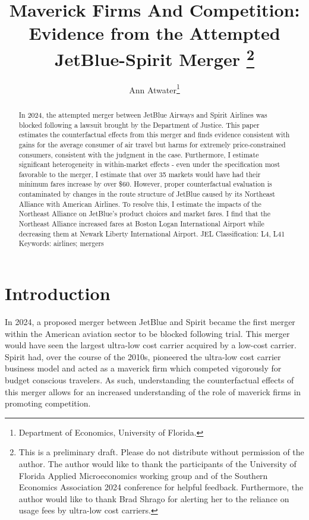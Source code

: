 \documentclass{article}
\author{Ann Atwater\footnote{Department of Economics, University of Florida.}}
\title{Maverick Firms And Competition: Evidence from the Attempted JetBlue-Spirit Merger \footnote{This is a preliminary draft. Please do not distribute without permission of the author. The author would like to thank the participants of the University of Florida Applied Microeconomics working group and of the Southern Economics Association 2024 conference for helpful feedback. Furthermore, the author would like to thank Brad Shrago for alerting her to the reliance on usage fees by ultra-low cost carriers. }}
\begin{document}
	\maketitle
	
	\begin{abstract}
In 2024, the attempted merger between JetBlue Airways and Spirit Airlines was blocked following a lawsuit brought by the Department of Justice. This paper estimates the counterfactual effects from this merger and finds evidence consistent with gains for the average consumer of air travel but harms for extremely price-constrained consumers, consistent with the judgment in the case. Furthermore, I estimate significant heterogeneity in within-market effects - even under the specification most favorable to the merger, I estimate that over 35 markets would have had their minimum fares increase by over \$60. However, proper counterfactual evaluation is contaminated by changes in the route structure of JetBlue caused by its Northeast Alliance with American Airlines. To resolve this, I estimate the impacts of the Northeast Alliance on JetBlue's product choices and market fares. I find that the Northeast Alliance increased fares at Boston Logan International Airport while decreasing them at Newark Liberty International Airport. \bigskip
	\noindent JEL Classification: L4, L41 \newline
	\noindent Keywords: airlines; mergers
		
	\end{abstract}
	
	\pagebreak
	
	\doublespacing
	
	\section{Introduction}
	\label{sec:Introduction} 

    In 2024, a proposed merger between JetBlue and Spirit became the first merger within the American aviation sector to be blocked following trial. This merger would have seen the largest ultra-low cost carrier acquired by a low-cost carrier. Spirit had, over the course of the 2010s, pioneered the ultra-low cost carrier business model and acted as a maverick firm which competed vigorously for budget conscious travelers. As such, understanding the counterfactual effects of this merger allows for an increased understanding of the role of maverick firms in promoting competition. 
 
\end{document}
